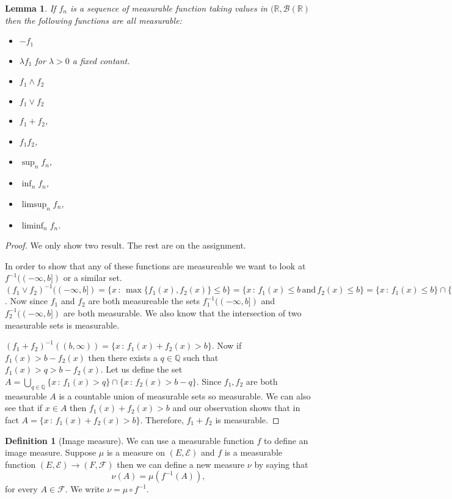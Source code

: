 \documentclass[11pt]{article}
\newtheorem{lem}[thm]{Lemma}
\theoremstyle{definition}
\newtheorem{dfn}[thm]{Definition}
\theoremstyle{remark}
\begin{document}
\begin{lem}
If $f_n$ is a sequence of measurable function taking values in $(\mathbb{R}, \mathcal{B}(\mathbb{R})$ then the following functions are all measurable:
\begin{itemize}
\item $-f_1$
\item $\lambda f_1$ for $\lambda >0$ a fixed contant.
\item $f_1 \wedge f_2$
\item $f_1 \vee f_2$
\item $f_1+f_2$,
\item $f_1 f_2$,
\item $\sup_n f_n$,
\item $\inf_n f_n$,
\item $\limsup_n f_n$,
\item $\liminf_n f_n$.
\end{itemize}
\end{lem}
\begin{proof} We only show two result. The rest are on the assignment.

 In order to show that any of these functions are measureable we want to look at $f^{-1}((-\infty, b])$ or a similar set. $(f_1 \vee f_2)^{-1}((-\infty, b]) = \{ x \,:\, \max\{f_1(x), f_2(x)\} \leq b\} = \{ x \,:\, f_1(x) \leq b \, \mbox{and} \, f_2(x) \leq b\} = \{ x \,:\, f_1(x) \leq b \} \cap \{x \,:\, f_2(x) \leq b\} = f_1^{-1}((-\infty, b]) \cap f_2^{-1}((-\infty, b])$. Now since $f_1$ and $f_2$ are both measureable the sets $f_1^{-1}((-\infty, b])$ and $f_2^{-1}((-\infty, b])$ are both measurable. We also know that the intersection of two measurable sets is measurable.

$(f_1+f_2)^{-1}((b,\infty)) = \{ x \,:\, f_1(x) + f_2(x) > b \}$. Now if $f_1(x) > b-f_2(x)$ then there exists a $q \in \mathbb{Q}$ such that $f_1(x)> q > b - f_2(x)$. Let us define the set $A= \bigcup_{q \in \mathbb{Q}} \{ x \,:\, f_1(x) > q\} \cap \{ x\,:\, f_2(x) > b-q\}$. Since $f_1,f_2$ are both measurable $A$ is a countable union of measurable sets so measurable. We can also see that if $x \in A$ then $f_1(x) + f_2(x) > b$ and our observation shows that in fact $A=  \{ x \,:\, f_1(x) + f_2(x) > b \}$. Therefore, $f_1+f_2$ is measurable.
\end{proof}



\begin{dfn}[Image measure]
We can use a measurable function $f$ to define an image measure. Suppose $\mu$ is a measure on $(E, \mathcal{E})$ and $f$ is a measurable function $(E, \mathcal{E}) \rightarrow (F, \mathcal{F})$ then we can define a new measure $\nu$ by saying that
\[ \nu(A) = \mu(f^{-1}(A)),  \] for every $A \in \mathcal{F}$. We write $\nu = \mu \circ f^{-1}$.
\end{dfn}
\end{document}
